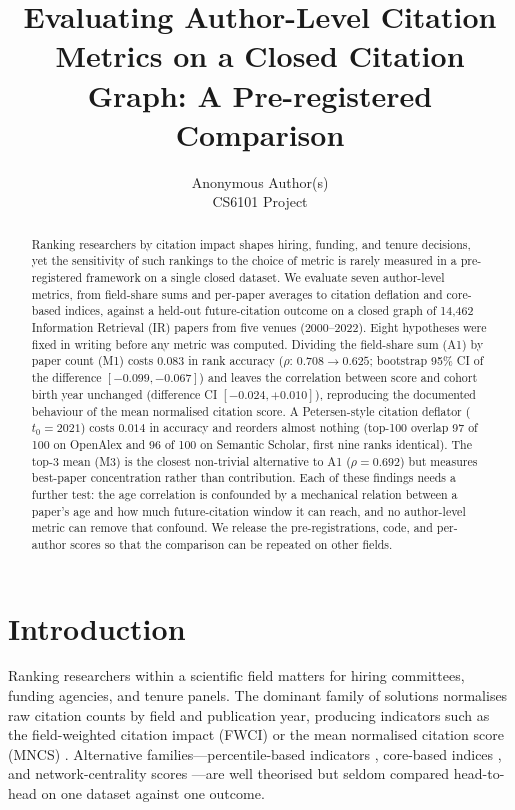 \documentclass{article}
\title{Evaluating Author-Level Citation Metrics on a Closed Citation Graph:
A Pre-registered Comparison}
\author{%
  Anonymous Author(s) \\
  CS6101 Project \\
}
\begin{document}
\maketitle

\begin{abstract}
Ranking researchers by citation impact shapes hiring, funding, and tenure decisions, yet the
sensitivity of such rankings to the choice of metric is rarely measured in a pre-registered
framework on a single closed dataset. We evaluate seven author-level metrics, from field-share
sums and per-paper averages to citation deflation and core-based indices, against a held-out
future-citation outcome on a closed graph of 14,462 Information Retrieval (IR) papers from five
venues (2000--2022). Eight hypotheses were fixed in writing before any metric was computed.
Dividing the field-share sum (A1) by paper count (M1) costs $0.083$ in rank accuracy
($\rho$: $0.708 \to 0.625$; bootstrap 95\% CI of the difference $[-0.099, -0.067]$) and leaves the
correlation between score and cohort birth year unchanged (difference CI $[-0.024, +0.010]$),
reproducing the documented behaviour of the mean normalised citation score. A Petersen-style
citation deflator ($t_0 = 2021$) costs $0.014$ in accuracy and reorders almost nothing (top-100
overlap 97 of 100 on OpenAlex and 96 of 100 on Semantic Scholar, first nine ranks identical). The top-3 mean (M3) is the closest non-trivial
alternative to A1 ($\rho = 0.692$) but measures best-paper concentration rather than
contribution. Each of these findings needs a further test: the age correlation is confounded by a
mechanical relation between a paper's age and how much future-citation window it can reach, and
no author-level metric can remove that confound. We release the pre-registrations, code, and
per-author scores so that the comparison can be repeated on other fields.
\end{abstract}

\section{Introduction}

Ranking researchers within a scientific field matters for hiring committees, funding agencies, and
tenure panels. The dominant family of solutions normalises raw citation counts by field and
publication year, producing indicators such as the field-weighted citation impact (FWCI) or the
mean normalised citation score (MNCS) \citep{waltman2016review, waltman2019chapter}. Alternative
families---percentile-based indicators \citep{bornmann2011further, bornmann2013percentiles}, core-based indices
\citep{hirsch2005index, egghe2006gindex}, and network-centrality scores \citep{ding2011pagerank,
west2010eigenfactor}---are well theorised but seldom compared head-to-head on one dataset against one
outcome.
\end{document}
